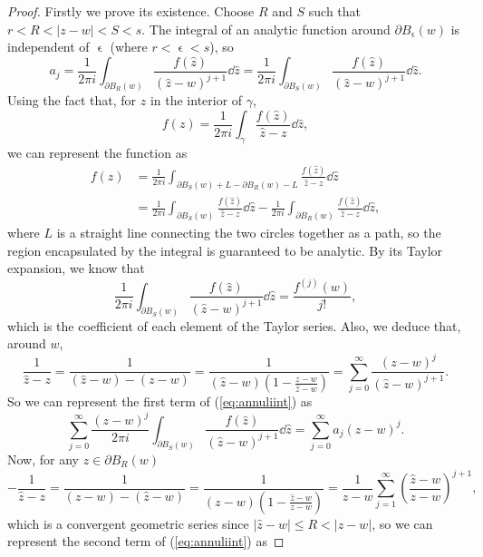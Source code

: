 \documentclass[a4paper]{article}
\begin{document}
\begin{proof}

Firstly we prove its existence. Choose $R$ and $S$ such that $r<R<|z-w|<S<s$. The integral of an analytic function around $\partial B_{\upvarepsilon}(w)$ is independent of $\upvarepsilon$ (where $r< \upvarepsilon <s$), so
\[a_{j} = \frac{1}{2\pi i }\int_{\partial B_{R}(w)} { \frac{f(\hat{z})}{(\hat{z}-w)^{j+1}} \dd\hat{z}} = \frac{1}{2\pi i }\int_{\partial B_{S}(w)} { \frac{f(\hat{z})}{(\hat{z}-w)^{j+1}} \dd\hat{z}}.\]
Using the fact that, for $z$ in the interior of $\gamma$,
\[f(z) = \frac{1}{2\pi i} \int_{\gamma} \frac{f(\hat{z})}{\hat{z}-z}\dd \hat{z},\]
we can represent the function as
\begin{align}
f(z) &=\frac{1}{2\pi i }\int_{\partial B_{S}(w)+L-\partial B_{R}(w)-L} { \frac{f(\hat{z})}{\hat{z}-z} \dd\hat{z}} \nonumber \\
& \label{eq:annuliint}=\frac{1}{2\pi i }\int_{\partial B_{S}(w)} { \frac{f(\hat{z})}{\hat{z}-z} \dd\hat{z}} - \frac{1}{2\pi i }\int_{\partial B_{R}(w)} { \frac{f(\hat{z})}{\hat{z}-z} \dd\hat{z}},
\end{align}
where $L$ is a straight line connecting the two circles together as a path, so the region encapsulated by the integral is guaranteed to be analytic. By its Taylor expansion, we know that
\[\frac{1}{2\pi i }\int_{\partial B_{S}(w)} { \frac{f(\hat{z})}{(\hat{z}-w)^{j+1}} \dd\hat{z} = \frac{f^{(j)}(w)}{j!}},\]
which is the coefficient of each element of the Taylor series. Also, we deduce that, around $w$, 
\[\frac{1}{\hat{z}-z} = \frac{1}{(\hat{z}-w)-(z-w)}= \frac{1}{(\hat{z}-w)(1-\frac{z-w}{\hat{z}-w})} =  \sum_{j=0}^{\infty}  \frac{(z-w)^{j}}{(\hat{z}-w)^{j+1}}.\]
So we can represent the first term of (\ref{eq:annuliint}) as
\[\sum_{j=0}^{\infty}\frac{(z-w)^{j}}{2\pi i }\int_{\partial B_{S}(w)} { \frac{f(\hat{z})}{(\hat{z}-w)^{j+1}} \dd\hat{z}} = \sum_{j=0}^{\infty} a_{j}(z-w)^{j}.\]
Now, for any $z \in \partial B_{R}(w)$
\[-\frac{1}{\hat{z}-z} = \frac{1}{(z-w)-(\hat{z}-w)}= \frac{1}{(z-w)(1-\frac{\hat{z}-w}{z-w})} = \frac{1}{z-w} \sum_{j=1}^{\infty} \left( \frac{\hat{z}-w}{z-w}\right) ^{j+1},\]
which is a convergent geometric series since $|\hat{z}-w| \leq R <|z-w| $, so we can represent the second term of (\ref{eq:annuliint}) as


\end{proof}
\end{document}
